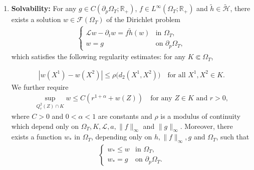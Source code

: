 \documentclass[11pt,oneside,english]{amsart}
\newcommand{\R}{{\mathbb R}}
\newcommand{\cL}{{\mathcal L}}
\newcommand{\cF}{{\mathcal F}}
\newcommand{\al}{\alpha}
\numberwithin{equation}{section}
\newcommand{\henrik}[1]{
\begin{quotation}[\textbf{\color{red}Henrik's comment:\
		}{\color{red}\textit{#1}}]
  \end{quotation}
  }
\theoremstyle{plain}
\numberwithin{equation}{section}
\newcommand{\Seongmin}[1]{\begin{quotation}[\textbf{\color{red}Seongmin:\     }	{\color{blue}\textit{#1}}]\end{quotation} }
\begin{document}
\medskip



\begin{enumerate}[label={\bf (PP\arabic*)}]
    \item\label{cond-sol-par} {\bf Solvability:}  For any $g\in C(\partial_p\Omega_T;\R_+)$, $f\in L^\infty(\Omega_T;\R_+)$ and $\tilde h\in\widetilde{\mathcal H}$, there exists a solution $w\in \cF(\Omega_T)$ of the Dirichlet problem 
    \begin{align}\label{eq:sol-Dir-par}
        \begin{cases}
            \cL w-\partial_tw=f\tilde h(w)&\text{in }\Omega_T,\\
            w=g&\text{on }\partial_p\Omega_T,
        \end{cases}
    \end{align}
    which satisfies the following regularity estimates: for any $K\Subset\Omega_T$,

    \begin{align}\label{eq:mod-conti-par}
|w(X^1)-w(X^2)|
\le \rho\big(d_2(X^1,X^2)\big)
\quad\text{for all }X^1,X^2\in K. 
\end{align}
    We further require 
    \begin{align}
        \label{eq:ftn-space-par}
        \sup_{Q_r^2(Z)\cap K}w\le C(r^{1+\al}+w(Z))\quad\text{for any } Z \in K\text{ and }r>0,
    \end{align} 
        where $C>0$ and $0<\al<1$ are constants and $\rho$ is a modulus of continuity which depend only on $\Omega_T,K,\cL,a,\|f\|_\infty$ and $\|g\|_\infty$.
        Moreover, there exists a  function $w_*$  in $\Omega_T$, depending only on $h,\|f\|_\infty, g$ and $\Omega_T$, such that
        \begin{align}\label{eq:lower-bound-par}
            \begin{cases}
        w_*\le w&\text{in }\Omega_T,\\
        w_*=g&\text{on }\partial_p\Omega_T.
    \end{cases}
        \end{align}


\end{enumerate}
\end{document}
